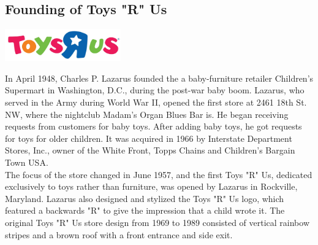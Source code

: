 \documentclass[11pt]{report}
\begin{document}
\subsection{Founding of Toys "R" Us}
\vspace{2mm}\begin{center}\includegraphics[width=5cm]{./img/toysRUsLogo.jpg}\end{center}
In April 1948, Charles P. Lazarus founded the a baby-furniture retailer Children's Supermart in Washington, D.C., during the post-war baby boom. Lazarus, who served in the Army during World War II, opened the first store at 2461 18th St. NW, where the nightclub Madam's Organ Blues Bar is. He began receiving requests from customers for baby toys. After adding baby toys, he got requests for toys for older children. It was acquired in 1966 by Interstate Department Stores, Inc., owner of the White Front, Topps Chains and Children's Bargain Town USA.\\ \indent The focus of the store changed in June 1957, and the first Toys "R" Us, dedicated exclusively to toys rather than furniture, was opened by Lazarus in Rockville, Maryland. Lazarus also designed and stylized the Toys "R" Us logo, which featured a backwards "R" to give the impression that a child wrote it. The original Toys "R" Us store design from 1969 to 1989 consisted of vertical rainbow stripes and a brown roof with a front entrance and side exit.

\section{}
\end{document}
